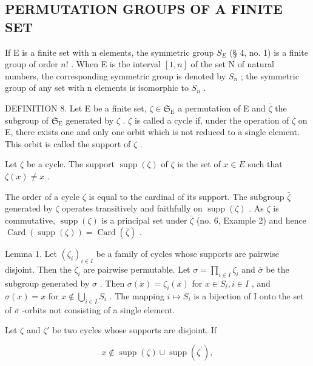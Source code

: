 \subsection{PERMUTATION GROUPS OF A FINITE SET}

If E is a finite set with n elements, the symmetric group \(S_{E}\) (§ 4, no. 1) is a finite group of order \(n!\) . When E is the interval \([1, n]\) of the set N of natural numbers, the corresponding symmetric group is denoted by \(S_{n}\) ; the symmetric group of any set with n elements is isomorphic to \(S_{n}\) .

DEFINITION 8. Let E be a finite set, \(\zeta \in \mathfrak{S}_{\mathrm{E}}\) a permutation of E and \(\bar{\zeta}\) the subgroup of \(\mathfrak{S}_{\mathrm{E}}\) generated by \(\zeta\) . \(\zeta\) is called a cycle if, under the operation of \(\bar{\zeta}\) on E, there exists one and only one orbit which is not reduced to a single element. This orbit is called the support of \(\zeta\) .

Let \(\zeta\) be a cycle. The support \(\operatorname{supp}(\zeta)\) of \(\zeta\) is the set of \(x \in E\) such that \(\zeta(x) \neq x\) .

The order of a cycle \(\zeta\) is equal to the cardinal of its support. The subgroup \(\bar{\zeta}\) generated by \(\zeta\) operates transitively and faithfully on \(\operatorname{supp}(\zeta)\) . As \(\zeta\) is commutative, \(\operatorname{supp}(\zeta)\) is a principal set under \(\bar{\zeta}\) (no. 6, Example 2) and hence \(\operatorname{Card}(\operatorname{supp}(\zeta)) = \operatorname{Card}(\bar{\zeta})\) .

Lemma 1. Let \((\zeta_{i})_{i\in I}\) be a family of cycles whose supports are pairwise disjoint. Then the \(\zeta_{i}\) are pairwise permutable. Let \(\sigma = \prod_{i\in I}\zeta_{i}\) and \(\overline{\sigma}\) be the subgroup generated by \(\sigma\) . Then \(\sigma(x) = \zeta_{i}(x)\) for \(x\in S_{i}, i\in I\) , and \(\sigma(x) = x\) for \(x\notin \bigcup_{i\in I}S_{i}\) . The mapping \(i\mapsto S_i\) is a bijection of I onto the set of \(\overline{\sigma}\) -orbits not consisting of a single element.

Let \(\zeta\) and \(\zeta'\) be two cycles whose supports are disjoint. If

\[
x \notin \operatorname{supp} (\zeta) \cup \operatorname{supp} \left(\zeta^ {\prime}\right),
\]

